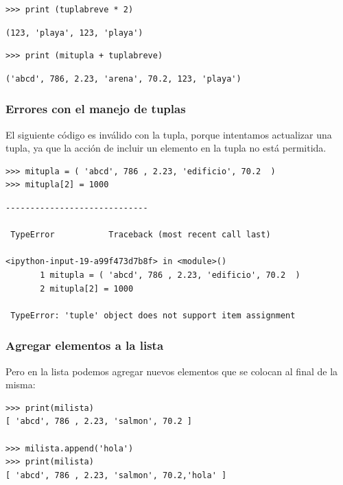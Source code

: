 {\begin{frame}[fragile]
\pause
\begin{verbatim}
>>> print (tuplabreve * 2)  
\end{verbatim}
\pause
\begin{verbatim}
(123, 'playa', 123, 'playa')
\end{verbatim}
\pause
\begin{verbatim}
>>> print (mitupla + tuplabreve)
\end{verbatim}
\pause
\begin{verbatim}
('abcd', 786, 2.23, 'arena', 70.2, 123, 'playa')
\end{verbatim}
\end{frame}
\begin{frame}[fragile]
\frametitle{Errores con el manejo de tuplas}
El siguiente código es inválido con la tupla, porque intentamos actualizar una tupla, ya que la acción de incluir un elemento en la tupla no está permitida.
\begin{verbatim}
>>> mitupla = ( 'abcd', 786 , 2.23, 'edificio', 70.2  )
>>> mitupla[2] = 1000
\end{verbatim}
\fontsize{8}{8}\selectfont
\begin{verbatim}
-----------------------------

 TypeError           Traceback (most recent call last)

<ipython-input-19-a99f473d7b8f> in <module>()
       1 mitupla = ( 'abcd', 786 , 2.23, 'edificio', 70.2  )
       2 mitupla[2] = 1000

 TypeError: 'tuple' object does not support item assignment
\end{verbatim}
\end{frame}
\begin{frame}[fragile]
\frametitle{Agregar elementos a la lista}
Pero en la lista podemos agregar nuevos elementos que se colocan al  final de la misma:
\begin{verbatim}
>>> print(milista)
[ 'abcd', 786 , 2.23, 'salmon', 70.2 ]

>>> milista.append('hola')
>>> print(milista)
[ 'abcd', 786 , 2.23, 'salmon', 70.2,'hola' ]
\end{verbatim}
\end{frame}
}

